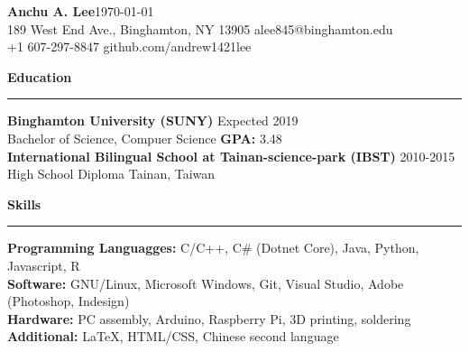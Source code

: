 \documentclass[11pt]{article}
\newcommand{\Hrule}{\vspace{1mm}\hrule\vspace{1mm}}
\begin{document}
    \noindent\Large\textbf{Anchu A. Lee}\hfill \small\today\\
    \noindent\small{189 West End Ave., Binghamton, NY 13905} \hfill \small{alee845@binghamton.edu}\\
    \noindent\small{+1 607-297-8847}\hfill\small{ github.com/andrew1421lee}
    \vspace{2mm}
    
    \noindent\large\textbf{Education}
    \Hrule
        \indent \small\textbf{Binghamton University (SUNY)} \hfill \small{Expected 2019}\indent\\
            \indent\indent\small{Bachelor of Science, Compuer Science \textbar \textbf{ GPA:} 3.48}\vspace{1mm}\\
        \indent \small\textbf{International Bilingual School at Tainan-science-park (IBST)} \hfill \small{2010-2015}\indent\\
            \indent\indent \small{High School Diploma } \hfill \small{Tainan, Taiwan}\indent\vspace{1mm}

    \noindent\large\textbf{Skills}
    \Hrule
        \indent \small\textbf{Programming Languagges: }\small{C/C++, C\# (Dotnet Core), Java, Python, Javascript, R}\vspace{0.5mm} \\
        \indent \small\textbf{Software: }\small{GNU/Linux, Microsoft Windows, Git, Visual Studio, Adobe (Photoshop, Indesign)}\vspace{0.5mm}\\
        \indent \small\textbf{Hardware: }\small{PC assembly, Arduino, Raspberry Pi, 3D printing, soldering}\vspace{0.5mm}\\
        \indent \small\textbf{Additional: }\small{LaTeX, HTML/CSS, Chinese second language}\vspace{1mm}
\end{document}
